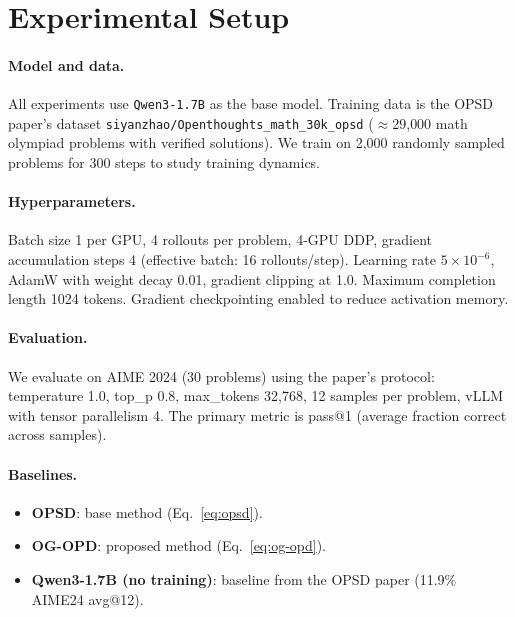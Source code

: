 \documentclass[11pt]{article}
\begin{document}
\section{Experimental Setup}
\label{sec:experiments}

\paragraph{Model and data.}
All experiments use \texttt{Qwen3-1.7B} as the base model.  Training data is the OPSD
paper's dataset \texttt{siyanzhao/Openthoughts\_math\_30k\_opsd} ($\approx$29{,}000
math olympiad problems with verified solutions).  We train on 2{,}000 randomly sampled
problems for 300 steps to study training dynamics.

\paragraph{Hyperparameters.}
Batch size 1 per GPU, 4 rollouts per problem, 4-GPU DDP, gradient accumulation steps 4
(effective batch: 16 rollouts/step).  Learning rate $5 \times 10^{-6}$, AdamW with weight
decay 0.01, gradient clipping at 1.0.  Maximum completion length 1024 tokens.
Gradient checkpointing enabled to reduce activation memory.

\paragraph{Evaluation.}
We evaluate on AIME 2024 (30 problems) using the paper's protocol: temperature 1.0,
top\_p 0.8, max\_tokens 32{,}768, 12 samples per problem, vLLM with tensor parallelism 4.
The primary metric is pass@1 (average fraction correct across samples).

\paragraph{Baselines.}
\begin{itemize}
  \item \textbf{OPSD}: base method (Eq.~\ref{eq:opsd}).
  \item \textbf{OG-OPD}: proposed method (Eq.~\ref{eq:og-opd}).
  \item \textbf{Qwen3-1.7B (no training)}: baseline from the OPSD paper (11.9\% AIME24
        avg@12).
\end{itemize}
\end{document}

